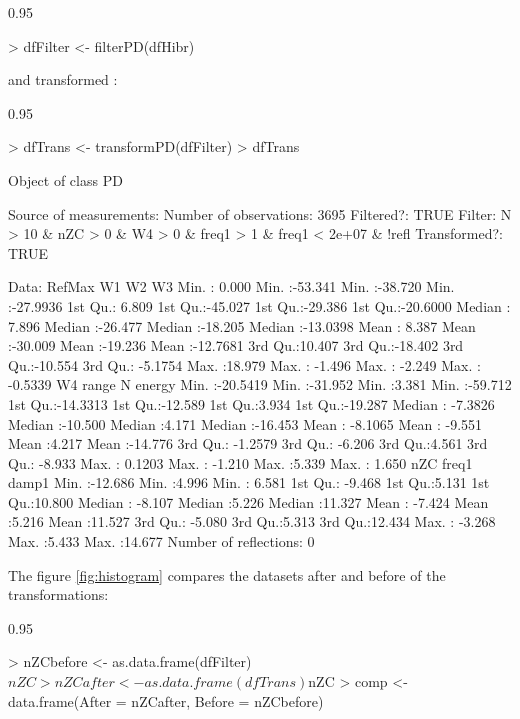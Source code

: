 \documentclass{article}
\renewenvironment{Schunk}{\begin{center}
    \scriptsize
    \begin{boxedminipage}{0.95\textwidth}}{
    \end{boxedminipage}\end{center}}
\begin{document}
\begin{Schunk}
\begin{Sinput}
> dfFilter <- filterPD(dfHibr)
\end{Sinput}
\end{Schunk}
and transformed \cite{Box.Cox1964}:

\begin{Schunk}
\begin{Sinput}
> dfTrans <- transformPD(dfFilter)
> dfTrans
\end{Sinput}
\begin{Soutput}
Object of class  PD 

Source of measurements:  
Number of observations:  3695 
Filtered?:  TRUE 
Filter: N > 10 & nZC > 0 & W4 > 0 & freq1 > 1 & freq1 < 2e+07 & !refl
Transformed?: TRUE 

Data:
     RefMax             W1                W2                W3          
 Min.   : 0.000   Min.   :-53.341   Min.   :-38.720   Min.   :-27.9936  
 1st Qu.: 6.809   1st Qu.:-45.027   1st Qu.:-29.386   1st Qu.:-20.6000  
 Median : 7.896   Median :-26.477   Median :-18.205   Median :-13.0398  
 Mean   : 8.387   Mean   :-30.009   Mean   :-19.236   Mean   :-12.7681  
 3rd Qu.:10.407   3rd Qu.:-18.402   3rd Qu.:-10.554   3rd Qu.: -5.1754  
 Max.   :18.979   Max.   : -1.496   Max.   : -2.249   Max.   : -0.5339  
       W4               range               N             energy       
 Min.   :-20.5419   Min.   :-31.952   Min.   :3.381   Min.   :-59.712  
 1st Qu.:-14.3313   1st Qu.:-12.589   1st Qu.:3.934   1st Qu.:-19.287  
 Median : -7.3826   Median :-10.500   Median :4.171   Median :-16.453  
 Mean   : -8.1065   Mean   : -9.551   Mean   :4.217   Mean   :-14.776  
 3rd Qu.: -1.2579   3rd Qu.: -6.206   3rd Qu.:4.561   3rd Qu.: -8.933  
 Max.   :  0.1203   Max.   : -1.210   Max.   :5.339   Max.   :  1.650  
      nZC              freq1           damp1       
 Min.   :-12.686   Min.   :4.996   Min.   : 6.581  
 1st Qu.: -9.468   1st Qu.:5.131   1st Qu.:10.800  
 Median : -8.107   Median :5.226   Median :11.327  
 Mean   : -7.424   Mean   :5.216   Mean   :11.527  
 3rd Qu.: -5.080   3rd Qu.:5.313   3rd Qu.:12.434  
 Max.   : -3.268   Max.   :5.433   Max.   :14.677  
Number of reflections:  0 
\end{Soutput}
\end{Schunk}

The figure \ref{fig:histogram} compares the datasets after and before
of the transformations:

\begin{Schunk}
\begin{Sinput}
> nZCbefore <- as.data.frame(dfFilter)$nZC
> nZCafter <- as.data.frame(dfTrans)$nZC
> comp <- data.frame(After = nZCafter, Before = nZCbefore)
\end{Sinput}
\end{Schunk}
\end{document}
